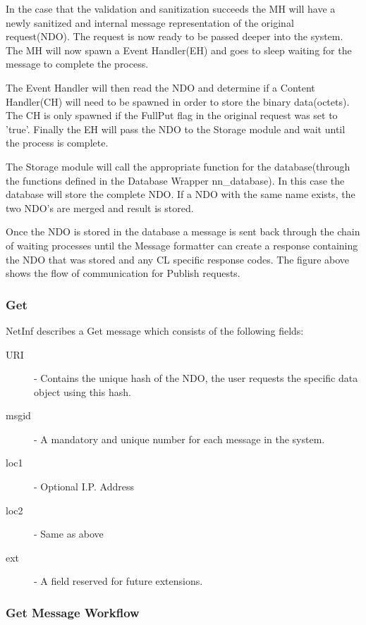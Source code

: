 In the case that the validation and sanitization succeeds the MH will have a newly sanitized and internal message representation of the original request(NDO). The request is now ready to be passed deeper into the system. The MH will now spawn a Event Handler(EH) and goes to sleep waiting for the message to complete the process. 

The Event Handler will then read the NDO and determine if a Content Handler(CH) will need to be spawned in order to store the binary data(octets). The CH is only spawned if the FullPut flag in the original request was set to 'true'. Finally the EH will pass the NDO to the Storage module and wait until the process is complete.

The Storage module will call the appropriate function for the database(through the functions defined in the Database Wrapper nn\_database). In this case the database will store the complete NDO. If a NDO with the same name exists, the two NDO's are merged and result is stored.

Once the NDO is stored in the database a message is sent back through the chain of waiting processes until the Message formatter can create a response containing the NDO that was stored and any CL specific response codes. The figure above shows the flow of communication for Publish requests.  


\subsubsection{Get}

NetInf describes a Get message which consists of the following fields:

\begin{description}
\item[URI] - Contains the unique hash of the NDO, the user requests the specific data object using this hash.
\item[msgid]- A mandatory and unique number for each message in the system.
\item[loc1] - Optional I.P. Address 
\item[loc2] - Same as above
\item[ext]  - A field reserved for future extensions.
\end{description}

\subsubsection{Get Message Workflow}


